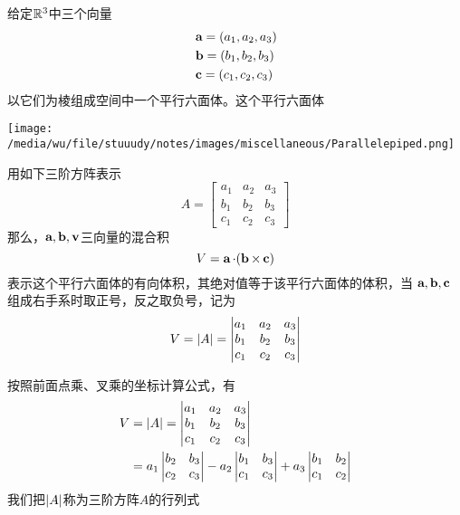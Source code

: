 \documentclass[11pt]{article}
\begin{document}
给定\(\mathbb{R}^3\)中三个向量
\begin{align*}
&\operatorname{\textbf{a}}=(a_1,a_2,a_3)\\
&\operatorname{\textbf{b}}=(b_1,b_2,b_3)\\
&\operatorname{\textbf{c}}=(c_1,c_2,c_3)
\end{align*}
以它们为棱组成空间中一个平行六面体。这个平行六面体
\begin{center}
\texttt{[image: /media/wu/file/stuuudy/notes/images/miscellaneous/Parallelepiped.png]}
\end{center}

用如下三阶方阵表示
\begin{equation*}
A=
\begin{bmatrix}
a_1&a_2&a_3\\b_1&b_2&b_3\\
c_1&c_2&c_3
\end{bmatrix}
\end{equation*}
那么，\(\operatorname{\textbf{a}},\operatorname{\textbf{b}},\operatorname{\textbf{v}}\)三向量的混合积
\begin{equation*}
V=\operatorname{\textbf{a}}\cdot(\operatorname{\textbf{b}}\times\operatorname{\textbf{c}})
\end{equation*}
表示这个平行六面体的有向体积，其绝对值等于该平行六面体的体积，当
\(\operatorname{\textbf{a}},\operatorname{\textbf{b}},\operatorname{\textbf{c}}\)组成右手系时取正号，反之取负号，记为
\begin{equation*}
V=\abs{A}=
\begin{vmatrix}
a_1&a_2&a_3\\b_1&b_2&b_3\\
c_1&c_2&c_3
\end{vmatrix}
\end{equation*}

按照前面点乘、叉乘的坐标计算公式，有
\begin{align*}
V&=\abs{A}=
\begin{vmatrix}
a_1&a_2&a_3\\
b_1&b_2&b_3\\
c_1&c_2&c_3
\end{vmatrix}\\
&=a_1
\begin{vmatrix}
b_2&b_3\\c_2&c_3\\
\end{vmatrix}-a_2
\begin{vmatrix}
b_1&b_3\\c_1&c_3\\
\end{vmatrix}+a_3
\begin{vmatrix}
b_1&b_2\\c_1&c_2
\end{vmatrix}
\end{align*}
我们把\(\abs{A}\)称为三阶方阵\(A\)的行列式
\end{document}
